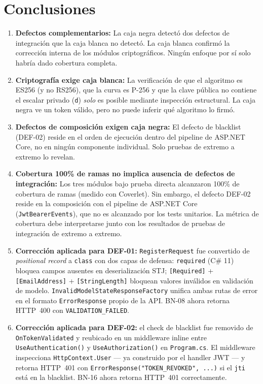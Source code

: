 \documentclass[11pt,a4paper]{article}
\begin{document}
\section{Conclusiones}

\begin{enumerate}[itemsep=4pt]
    \item \textbf{Defectos complementarios:} La caja negra detectó dos defectos de integración que la caja blanca no detectó. La caja blanca confirmó la corrección interna de los módulos criptográficos. Ningún enfoque por sí solo habría dado cobertura completa.

    \item \textbf{Criptografía exige caja blanca:} La verificación de que el algoritmo es ES256 (y no RS256), que la curva es P-256 y que la clave pública no contiene el escalar privado (\texttt{d}) \emph{solo} es posible mediante inspección estructural. La caja negra ve un token válido, pero no puede inferir qué algoritmo lo firmó.

    \item \textbf{Defectos de composición exigen caja negra:} El defecto de blacklist (DEF-02) reside en el orden de ejecución dentro del pipeline de ASP.NET Core, no en ningún componente individual. Solo pruebas de extremo a extremo lo revelan.

    \item \textbf{Cobertura 100\% de ramas no implica ausencia de defectos de integración:} Los tres módulos bajo prueba directa alcanzaron 100\% de cobertura de ramas (medido con Coverlet). Sin embargo, el defecto DEF-02 reside en la composición con el pipeline de ASP.NET Core (\texttt{JwtBearerEvents}), que no es alcanzado por los tests unitarios. La métrica de cobertura debe interpretarse junto con los resultados de pruebas de integración de extremo a extremo.

    \item \textbf{Corrección aplicada para DEF-01:} \texttt{RegisterRequest} fue convertido de \textit{positional record} a \texttt{class} con dos capas de defensa: \texttt{required} (C\# 11) bloquea campos ausentes en deserialización STJ; \texttt{[Required]} + \texttt{[EmailAddress]} + \texttt{[StringLength]} bloquean valores inválidos en validación de modelo. \texttt{InvalidModelStateResponseFactory} unifica ambas rutas de error en el formato \texttt{ErrorResponse} propio de la API. BN-08 ahora retorna HTTP~400 con \texttt{VALIDATION\_FAILED}.

    \item \textbf{Corrección aplicada para DEF-02:} el check de blacklist fue removido de \texttt{OnTokenValidated} y reubicado en un middleware inline entre \texttt{UseAuthentication()} y \texttt{UseAuthorization()} en \texttt{Program.cs}. El middleware inspecciona \texttt{HttpContext.User} — ya construido por el handler JWT — y retorna HTTP~401 con \texttt{ErrorResponse("TOKEN\_REVOKED",~...)} si el \texttt{jti} está en la blacklist. BN-16 ahora retorna HTTP~401 correctamente.
\end{enumerate}
\end{document}
